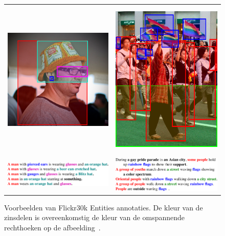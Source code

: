 \begin{figure}[!tb]
    \centering
    \begin{tabular}[t]{cc}
      \includegraphics[height=3.0in]{Images/example_hat.png} \vspace{-3mm}&
      \includegraphics[height=3.0in]{Images/example_parade.png}\\
      \includegraphics[valign = T,width=.4\columnwidth]{Images/example_hat_text.pdf}&
      \includegraphics[valign = T,width=.4\columnwidth]{Images/example_parade_text.pdf}
  \end{tabular}
\caption[Voorbeelden van Flickr30k Entities annotaties]{Voorbeelden van Flickr30k Entities annotaties. De kleur van de zinsdelen is overeenkomstig de kleur van de omspannende rechthoeken op de afbeelding~\cite{Plummer2015}.}
\label{fig:entities}
\end{figure}

